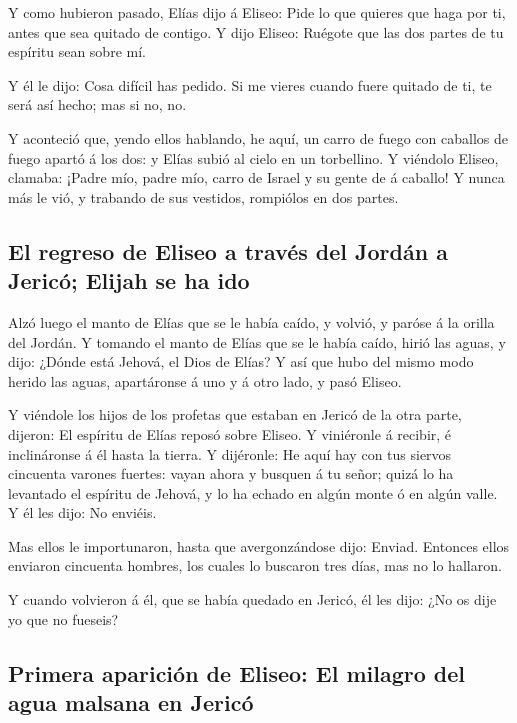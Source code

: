  Y como hubieron pasado, Elías dijo á Eliseo: Pide lo que
quieres que haga por ti, antes que sea quitado de contigo. Y dijo
Eliseo: Ruégote que las dos partes de tu espíritu sean sobre mí.

 Y él le dijo: Cosa difícil has pedido. Si me vieres
cuando fuere quitado de ti, te será así hecho; mas si no, no.

 Y aconteció que, yendo ellos hablando, he aquí, un carro
de fuego con caballos de fuego apartó á los dos: y Elías subió al cielo
en un torbellino.  Y viéndolo Eliseo, clamaba: ¡Padre
mío, padre mío, carro de Israel y su gente de á caballo! Y nunca más le
vió, y trabando de sus vestidos, rompiólos en dos partes.

\hypertarget{el-regreso-de-eliseo-a-travuxe9s-del-jorduxe1n-a-jericuxf3-elijah-se-ha-ido}{%
\subsection{El regreso de Eliseo a través del Jordán a Jericó; Elijah se
ha
ido}\label{el-regreso-de-eliseo-a-travuxe9s-del-jorduxe1n-a-jericuxf3-elijah-se-ha-ido}}

 Alzó luego el manto de Elías que se le había caído, y
volvió, y paróse á la orilla del Jordán.  Y tomando el
manto de Elías que se le había caído, hirió las aguas, y dijo: ¿Dónde
está Jehová, el Dios de Elías? Y así que hubo del mismo modo herido las
aguas, apartáronse á uno y á otro lado, y pasó Eliseo.

 Y viéndole los hijos de los profetas que estaban en
Jericó de la otra parte, dijeron: El espíritu de Elías reposó sobre
Eliseo. Y viniéronle á recibir, é inclináronse á él hasta la tierra.
 Y dijéronle: He aquí hay con tus siervos cincuenta
varones fuertes: vayan ahora y busquen á tu señor; quizá lo ha levantado
el espíritu de Jehová, y lo ha echado en algún monte ó en algún valle. Y
él les dijo: No enviéis.

 Mas ellos le importunaron, hasta que avergonzándose
dijo: Enviad. Entonces ellos enviaron cincuenta hombres, los cuales lo
buscaron tres días, mas no lo hallaron.

 Y cuando volvieron á él, que se había quedado en Jericó,
él les dijo: ¿No os dije yo que no fueseis?

\hypertarget{primera-apariciuxf3n-de-eliseo-el-milagro-del-agua-malsana-en-jericuxf3}{%
\subsection{Primera aparición de Eliseo: El milagro del agua malsana en
Jericó}\label{primera-apariciuxf3n-de-eliseo-el-milagro-del-agua-malsana-en-jericuxf3}}

